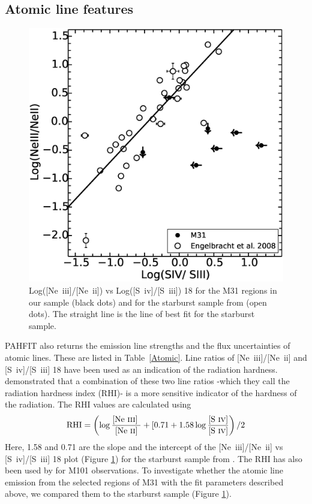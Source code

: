 \subsection{Atomic line features}
\label{sect:atomic}

\begin{figure}
\centering
\includegraphics[scale=0.3]{./NevsS.eps}
\caption{ Log([Ne~{\sc iii}]/[Ne~{\sc ii}])  vs Log([S~{\sc iv}]/[S~{\sc iii}]) 18 for the M31 regions in our sample (black dots) and for the starburst sample from \citet{Engelbracht_2008} (open dots). The straight line is the line of best fit for the starburst sample.}
\label{SvsNe}
\end{figure}

PAHFIT also returns the emission line strengths and the flux uncertainties of atomic lines. These are listed in Table~\ref{Atomic}.
Line ratios of [Ne~{\sc iii}]/[Ne~{\sc ii}] and [S~{\sc iv}]/[S~{\sc iii}] 18 have been used as an indication of the radiation hardness. \citet{Engelbracht_2008} demonstrated that a combination of these two line ratios -which they call the radiation hardness index (RHI)- is a more sensitive indicator of the hardness of the radiation. The RHI values are calculated using
\begin{equation}
{\rm RHI} = \left( \log\frac{\textrm{[Ne~{\sc iii}] }}{\textrm{[Ne~{\sc ii}]}} + [0.71 + 1.58\log\frac{\textrm{{[S~{\sc iv}]}}}{\textrm{{[S~{\sc iv}]}}}\right) /2
\end{equation}
Here, 1.58 and 0.71 are the slope and the intercept of the [Ne~{\sc iii}]/[Ne~{\sc ii}]  vs [S~{\sc iv}]/[S~{\sc iii}] 18 plot (Figure \ref{SvsNe}) for the starburst sample from 
\citet{Engelbracht_2008}. The RHI has also been used by \citet{Gordon:2008lr} for M101 observations. To investigate whether the atomic line emission from the selected regions of M31 with the fit parameters described above, we compared them to the starburst sample (Figure \ref{SvsNe}). 
	
